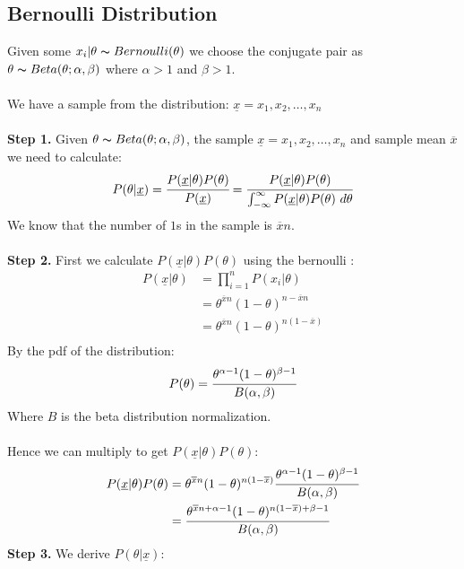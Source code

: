 \subsection{Bernoulli Distribution}
Given some $x_i|\theta \thicksim Bernoulli(\theta)$ we choose the conjugate pair as $\theta \thicksim Beta(\theta; \alpha, \beta)$ where $\alpha> 1$ and $\beta > 1$.
\\
\\ We have a sample from the distribution: $\underline{x} = x_1, x_2, \dots, x_n$
\\
\\ \textbf{Step 1.} Given $\theta \thicksim Beta(\theta; \alpha, \beta)$, the sample $\underline{x} = x_1, x_2, \dots, x_n$ and sample mean $\overline{x}$
we need to calculate:
\[P(\theta|\underline{x}) = \cfrac{P(\underline{x}|\theta)P(\theta)}{P(\underline{x})} = \cfrac{P(\underline{x}|\theta)P(\theta)}{\int_{-\infty}^\infty P(\underline{x}|\theta)P(\theta) \ d\theta}\]
We know that the number of $1$s in the sample is $\overline{x}n$.
\\
\\ \textbf{Step 2.} First we calculate $P(\underline{x}|\theta)P(\theta)$ using the bernoulli :
\[\begin{split}
		P(\underline{x}|\theta) &= \prod_{i=1}^n P(x_i|\theta) \\
		&= \theta^{\overline{x}n}(1-\theta)^{n - \overline{x}n} \\
		&= \theta^{\overline{x}n}(1-\theta)^{n(1 - \overline{x})} \\
	\end{split}\]
By the pdf of the  distribution:
\[P(\theta) = \cfrac{\theta^{\alpha - 1}(1 - \theta)^{\beta - 1}}{B(\alpha,\beta)}\]
Where $B$ is the beta distribution normalization.
\\
\\ Hence we can multiply to get $P(\underline{x}|\theta)P(\theta)$:
\[\begin{split}
		P(\underline{x}|\theta)P(\theta) &= \theta^{\overline{x}n}(1-\theta)^{n(1 - \overline{x})}\cfrac{\theta^{\alpha - 1}(1 - \theta)^{\beta - 1}}{B(\alpha,\beta)} \\
		&= \cfrac{\theta^{\overline{x}n + \alpha - 1}(1 - \theta)^{n(1 - \overline{x}) + \beta - 1}}{B(\alpha,\beta)} \\
	\end{split}\]
\textbf{Step 3.} We derive $P(\theta|\underline{x})$:
